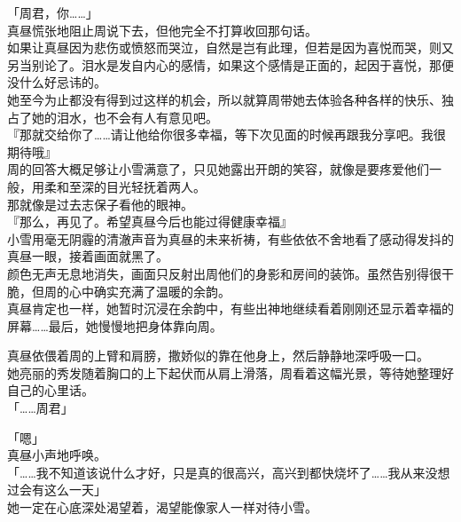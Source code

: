 「周君，你……」\\

真昼慌张地阻止周说下去，但他完全不打算收回那句话。\\

如果让真昼因为悲伤或愤怒而哭泣，自然是岂有此理，但若是因为喜悦而哭，则又另当别论了。泪水是发自内心的感情，如果这个感情是正面的，起因于喜悦，那便没什么好忌讳的。\\

她至今为止都没有得到过这样的机会，所以就算周带她去体验各种各样的快乐、独占了她的泪水，也不会有人有意见吧。\\

『那就交给你了……请让他给你很多幸福，等下次见面的时候再跟我分享吧。我很期待哦』\\

周的回答大概足够让小雪满意了，只见她露出开朗的笑容，就像是要疼爱他们一般，用柔和至深的目光轻抚着两人。\\

那就像是过去志保子看他的眼神。\\

『那么，再见了。希望真昼今后也能过得健康幸福』\\

小雪用毫无阴霾的清澈声音为真昼的未来祈祷，有些依依不舍地看了感动得发抖的真昼一眼，接着画面就黑了。\\

颜色无声无息地消失，画面只反射出周他们的身影和房间的装饰。虽然告别得很干脆，但周的心中确实充满了温暖的余韵。\\

真昼肯定也一样，她暂时沉浸在余韵中，有些出神地继续看着刚刚还显示着幸福的屏幕……最后，她慢慢地把身体靠向周。

真昼依偎着周的上臂和肩膀，撒娇似的靠在他身上，然后静静地深呼吸一口。\\

她亮丽的秀发随着胸口的上下起伏而从肩上滑落，周看着这幅光景，等待她整理好自己的心里话。\\

「……周君」

「嗯」\\

真昼小声地呼唤。\\

「……我不知道该说什么才好，只是真的很高兴，高兴到都快烧坏了……我从来没想过会有这么一天」\\

她一定在心底深处渴望着，渴望能像家人一样对待小雪。\\

